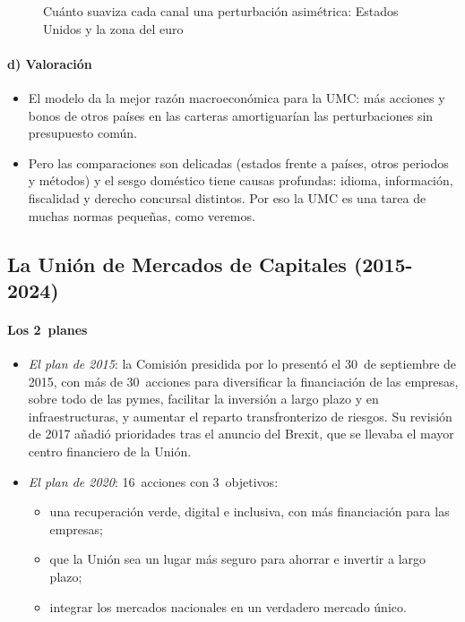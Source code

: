 \documentclass[11pt]{article}
\begin{document}
\begin{figure}[H]
\centering
\caption{Cuánto suaviza cada canal una perturbación asimétrica: Estados Unidos y la zona del euro}\label{fig:reparto}
\end{figure}

\paragraph{d) Valoración}

\begin{itemize}
\item El modelo da la mejor razón macroeconómica para la UMC: más acciones y bonos de otros países en las carteras amortiguarían las perturbaciones sin presupuesto común.
\item Pero las comparaciones son delicadas (estados frente a países, otros periodos y métodos) y el sesgo doméstico tiene causas profundas: idioma, información, fiscalidad y derecho concursal distintos. Por eso la UMC es una tarea de muchas normas pequeñas, como veremos.
\end{itemize}

\subsection{La Unión de Mercados de Capitales (2015-2024)}\label{sec:umc-planes}

\paragraph{Los 2~planes}

\begin{itemize}
\item \emph{El plan de 2015}: la Comisión presidida por  lo presentó el 30~de septiembre de 2015, con más de 30~acciones para diversificar la financiación de las empresas, sobre todo de las pymes, facilitar la inversión a largo plazo y en infraestructuras, y aumentar el reparto transfronterizo de riesgos\nocite{CE2015PlanUMC}. Su revisión de 2017 añadió prioridades tras el anuncio del Brexit, que se llevaba el mayor centro financiero de la Unión.
\item \emph{El plan de 2020}: 16~acciones con 3~objetivos\nocite{CE2020PlanUMC}:
  \begin{itemize}
  \item una recuperación verde, digital e inclusiva, con más financiación para las empresas;
  \item que la Unión sea un lugar más seguro para ahorrar e invertir a largo plazo;
  \item integrar los mercados nacionales en un verdadero mercado único.
  \end{itemize}
\end{itemize}
\end{document}
